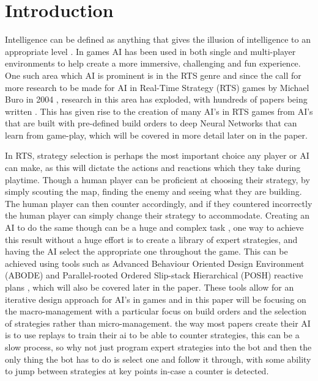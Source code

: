 \documentclass[journal]{IEEEtran}
\begin{document}
\section{Introduction}
 Intelligence can be defined as anything that gives the illusion of intelligence to an appropriate level \cite{AIBook}. In games AI has been used in both single and multi-player environments to help create a more immersive, challenging and fun experience. One such area which AI is prominent is in the RTS genre and since the call for more research to be made for AI in Real-Time Strategy (RTS) games by Michael Buro in 2004 \cite{CallFor}, research in this area has exploded, with hundreds of papers being written \cite{Survey}. This has given rise to the creation of many AI's in RTS games from AI's that are built with pre-defined build orders \cite{Swen} to deep Neural Networks \cite{Deep} that can learn from game-play, which will be covered in more detail later on in the paper.

In RTS, strategy selection is perhaps the most important choice any player or AI can make, as this will dictate the actions and reactions which they take during playtime. Though a human player can be proficient at choosing their strategy, by simply scouting the map, finding the enemy and seeing what they are building. The human player can then counter accordingly, and if they countered incorrectly the human player can simply change their strategy to accommodate. Creating an AI to do the same though can be a huge and complex task \cite{Fuzzy}\cite{OnlineEvo}\cite{GoalDriven}, one way to achieve this result without a huge effort is to create a library of expert strategies, and having the AI select the appropriate one throughout the game. This can be achieved using tools such as Advanced Behaviour Oriented Design Environment (ABODE) and Parallel-rooted Ordered Slip-stack Hierarchical (POSH) reactive plans \cite{POSH}, which will also be covered later in the paper. These tools allow for an iterative design approach for AI's in games and in this paper will be focusing on the macro-management with a particular focus on build orders and the selection of strategies rather than micro-management.  the way most papers create their AI is to use replays to train their ai to be able to counter strategies, this can be a slow process, so why not just program expert strategies into the bot and then the only thing the bot has to do is select one and follow it through, with some ability to jump between strategies at key points in-case a counter is detected. 
\end{document}
